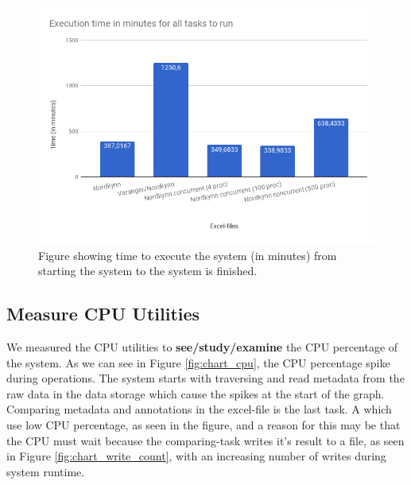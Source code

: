 \documentclass[USenglish]{uit-thesis}
\begin{document}
\begin{figure}
\centering
\includegraphics[width=\textwidth]{chart2_done.png}
\caption{Figure showing time to execute the system (in minutes) from starting the system to the system is finished.}
\label{fig:time_chart_overall}
\end{figure}



\subsection{Measure CPU Utilities}

We measured the CPU utilities to \textbf{see/study/examine} the CPU percentage of the system. As we can see in Figure \ref{fig:chart_cpu}, the CPU percentage spike during operations. The system starts with traversing and read metadata from the raw data in the data storage which cause the spikes at the start of the graph. Comparing metadata and annotations in the excel-file is the last task. A which use low CPU percentage, as seen in the figure, and a reason for this may be that the CPU must wait because the comparing-task writes it's result to a file, as seen in Figure \ref{fig:chart_write_count}, with an increasing number of writes during system runtime.
\end{document}
